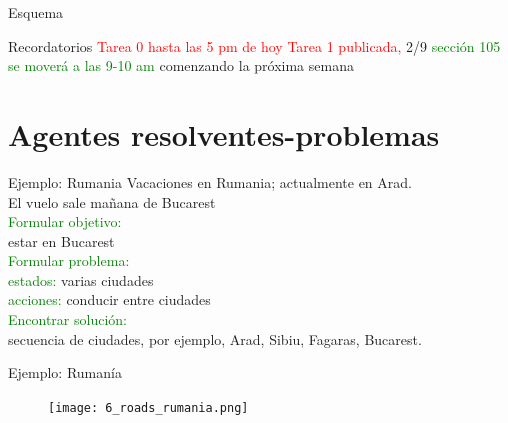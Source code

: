 \documentclass{beamer}
\theoremstyle{definition}
\theoremstyle{theorem}
\theoremstyle{remark}
\begin{document}

\begin{frame}{Esquema}
  \tableofcontents%
 
\end{frame}


\begin{frame}{Recordatorios}
    \textcolor{red}{Tarea 0 hasta las 5 pm de hoy} \newline
    \textcolor{red}{Tarea 1 publicada,} 2/9 \newline
    \textcolor{Green}{sección 105 se moverá a las 9-10 am} comenzando la próxima semana
\end{frame}

\section{Agentes resolventes-problemas}%


\begin{frame}{Ejemplo: Rumania}
Vacaciones en Rumania; actualmente en Arad.\\
El vuelo sale mañana de Bucarest\\
\textcolor{Green}{Formular objetivo:}\\
\hspace{0.8cm}estar en Bucarest\\
\textcolor{Green}{Formular problema:}\\
\hspace{0.8cm}\textcolor{Green}{estados:} varias ciudades\\
\hspace{0.8cm}\textcolor{Green}{acciones:} conducir entre ciudades\\
\textcolor{Green}{Encontrar solución:}\\
\hspace{0.8cm}secuencia de ciudades, por ejemplo, Arad, Sibiu, Fagaras, Bucarest.
\end{frame}


\begin{frame}{Ejemplo: Rumanía}
\begin{figure}
  \texttt{[image: 6\_roads\_rumania.png]}
\end{figure}
\end{frame}
\end{document}
